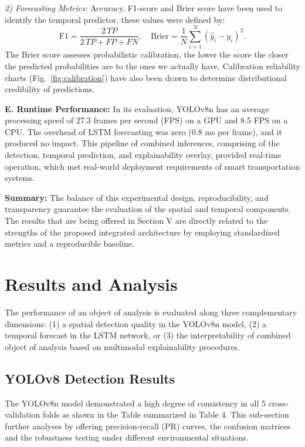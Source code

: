 \documentclass[conference]{IEEEtran}
\begin{document}
\textit{2) Forecasting Metrics:}  
Accuracy, F1-score and Brier score have been used to identify the temporal predictor, these values were defined by:
\[
\text{F1} = \frac{2\,TP}{2\,TP + FP + FN}, \quad
\text{Brier} = \frac{1}{N}\sum_{i=1}^N (\hat{y}_i - y_i)^2.
\]
The Brier score assesses probabilistic calibration, the lower the score the closer the predicted probabilities are to the ones we actually have.  
Calibration reliability charts (Fig.~\ref{fig:calibration})  have also been drawn to determine distributional credibility of predictions.

\vspace{0.4em}
\noindent\textbf{E. Runtime Performance:}
In its evaluation, YOLOv8n has an average processing speed of 27.3 frames per second (FPS) on a GPU and 8.5 FPS on a CPU. The overhead of LSTM forecasting was zero (0.8 ms per frame), and it produced no impact.  
This pipeline of combined inferences, comprising of the detection, temporal prediction, and explainability overlay, provided real-time operation, which met real-world deployment requirements of smart transportation systems.

\vspace{0.4em}
\noindent\textbf{Summary:}
The balance of this experimental design, reproducibility, and transparency guarantee the evaluation of the spatial and temporal components. The results that are being offered in Section V are directly related to the strengths of the proposed integrated architecture by employing standardized metrics and a reproducible baseline.

\section{Results and Analysis}
The performance of an object of analysis is evaluated along three complementary dimensions: (1) a spatial detection quality in the YOLOv8n model, (2) a temporal forecast in the LSTM network, or (3) the interpretability of combined object of analysis based on multimodal explainability procedures.

\subsection{YOLOv8 Detection Results}
The YOLOv8n model demonstrated a high degree of consistency in all 5 cross-validation folds as shown in the Table summarized in Table 4. This sub-section further analyses by offering precision-recall (PR) curves, the confusion matrices and the robustness testing under different environmental situations.
\end{document}
